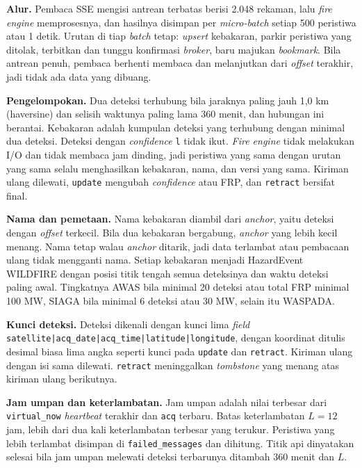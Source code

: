 \textbf{Alur.} Pembaca SSE mengisi antrean terbatas berisi 2.048 rekaman, lalu \textit{fire engine} memprosesnya, dan hasilnya disimpan per \textit{micro-batch} setiap 500 peristiwa atau 1 detik. Urutan di tiap \textit{batch} tetap: \textit{upsert} kebakaran, parkir peristiwa yang ditolak, terbitkan dan tunggu konfirmasi \textit{broker}, baru majukan \textit{bookmark}. Bila antrean penuh, pembaca berhenti membaca dan melanjutkan dari \textit{offset} terakhir, jadi tidak ada data yang dibuang.

\textbf{Pengelompokan.} Dua deteksi terhubung bila jaraknya paling jauh 1,0 km (haversine) dan selisih waktunya paling lama 360 menit, dan hubungan ini berantai. Kebakaran adalah kumpulan deteksi yang terhubung dengan minimal dua deteksi. Deteksi dengan \textit{confidence} \texttt{l} tidak ikut. \textit{Fire engine} tidak melakukan I/O dan tidak membaca jam dinding, jadi peristiwa yang sama dengan urutan yang sama selalu menghasilkan kebakaran, nama, dan versi yang sama. Kiriman ulang dilewati, \texttt{update} mengubah \textit{confidence} atau FRP, dan \texttt{retract} bersifat final.

\textbf{Nama dan pemetaan.} Nama kebakaran diambil dari \textit{anchor}, yaitu deteksi dengan \textit{offset} terkecil. Bila dua kebakaran bergabung, \textit{anchor} yang lebih kecil menang. Nama tetap walau \textit{anchor} ditarik, jadi data terlambat atau pembacaan ulang tidak mengganti nama. Setiap kebakaran menjadi HazardEvent WILDFIRE dengan posisi titik tengah semua deteksinya dan waktu deteksi paling awal. Tingkatnya AWAS bila minimal 20 deteksi atau total FRP minimal 100 MW, SIAGA bila minimal 6 deteksi atau 30 MW, selain itu WASPADA.

\textbf{Kunci deteksi.} Deteksi dikenali dengan kunci lima \textit{field} \texttt{satellite|acq\_date|acq\_time|latitude|longitude}, dengan koordinat ditulis desimal biasa lima angka seperti kunci pada \texttt{update} dan \texttt{retract}. Kiriman ulang dengan isi sama dilewati. \texttt{retract} meninggalkan \textit{tombstone} yang menang atas kiriman ulang berikutnya.

\textbf{Jam umpan dan keterlambatan.} Jam umpan adalah nilai terbesar dari \texttt{virtual\_now} \textit{heartbeat} terakhir dan \texttt{acq} terbaru. Batas keterlambatan $L = 12$ jam, lebih dari dua kali keterlambatan terbesar yang terukur. Peristiwa yang lebih terlambat disimpan di \texttt{failed\_messages} dan dihitung. Titik api dinyatakan selesai bila jam umpan melewati deteksi terbarunya ditambah 360 menit dan $L$.

